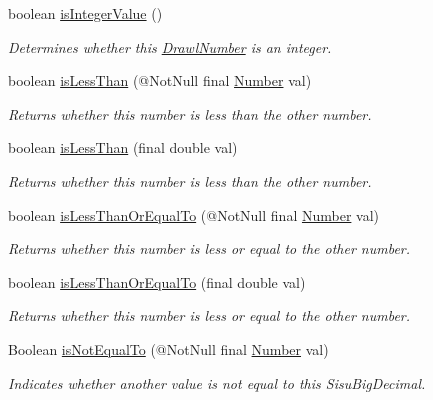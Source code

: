 \begin{DoxyCompactItemize}
boolean \hyperlink{interfacecom_1_1aarrelaakso_1_1drawl_1_1_number_a33d0b6d8f3aeb0ccb9f710739c80f6e7}{is\+Integer\+Value} ()
\begin{DoxyCompactList}\small\item\em Determines whether this \hyperlink{classcom_1_1aarrelaakso_1_1drawl_1_1_drawl_number}{Drawl\+Number} is an integer. \end{DoxyCompactList}\item 
boolean \hyperlink{interfacecom_1_1aarrelaakso_1_1drawl_1_1_number_acc7fec3a209cb27e09a45f17ed9fd4e1}{is\+Less\+Than} (@Not\+Null final \hyperlink{interfacecom_1_1aarrelaakso_1_1drawl_1_1_number}{Number} val)
\begin{DoxyCompactList}\small\item\em Returns whether this number is less than the other number. \end{DoxyCompactList}\item 
boolean \hyperlink{interfacecom_1_1aarrelaakso_1_1drawl_1_1_number_a82b299428c48204fb05229dbea2b439b}{is\+Less\+Than} (final double val)
\begin{DoxyCompactList}\small\item\em Returns whether this number is less than the other number. \end{DoxyCompactList}\item 
boolean \hyperlink{interfacecom_1_1aarrelaakso_1_1drawl_1_1_number_a195d37075fcef873df2907194e794836}{is\+Less\+Than\+Or\+Equal\+To} (@Not\+Null final \hyperlink{interfacecom_1_1aarrelaakso_1_1drawl_1_1_number}{Number} val)
\begin{DoxyCompactList}\small\item\em Returns whether this number is less or equal to the other number. \end{DoxyCompactList}\item 
boolean \hyperlink{interfacecom_1_1aarrelaakso_1_1drawl_1_1_number_a99ddc795a01b241e97345cfd6b85e00b}{is\+Less\+Than\+Or\+Equal\+To} (final double val)
\begin{DoxyCompactList}\small\item\em Returns whether this number is less or equal to the other number. \end{DoxyCompactList}\item 
Boolean \hyperlink{interfacecom_1_1aarrelaakso_1_1drawl_1_1_number_a4684335f60995aca55e4b972fbb3b8ca}{is\+Not\+Equal\+To} (@Not\+Null final \hyperlink{interfacecom_1_1aarrelaakso_1_1drawl_1_1_number}{Number} val)
\begin{DoxyCompactList}\small\item\em Indicates whether another value is not equal to this Sisu\+Big\+Decimal. \end{DoxyCompactList}\item 

\end{DoxyCompactItemize}
